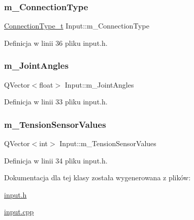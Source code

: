 \subsubsection{\texorpdfstring{m\+\_\+\+Connection\+Type}{m\_ConnectionType}}
{\footnotesize\ttfamily \hyperlink{class_input_a3be20be9b454515798ecd3370f4e36fd}{Connection\+Type\+\_\+t} Input\+::m\+\_\+\+Connection\+Type\hspace{0.3cm}{\ttfamily [private]}}



Definicja w linii 36 pliku input.\+h.

\mbox{\label{class_input_a5d17336e82b13b4a5416ea0bf197c5ba}} 
\subsubsection{\texorpdfstring{m\+\_\+\+Joint\+Angles}{m\_JointAngles}}
{\footnotesize\ttfamily Q\+Vector$<$float$>$ Input\+::m\+\_\+\+Joint\+Angles\hspace{0.3cm}{\ttfamily [private]}}



Definicja w linii 33 pliku input.\+h.

\mbox{\label{class_input_a1ce9ef99c48ee1e7adee67ecadd161c6}} 
\subsubsection{\texorpdfstring{m\+\_\+\+Tension\+Sensor\+Values}{m\_TensionSensorValues}}
{\footnotesize\ttfamily Q\+Vector$<$int$>$ Input\+::m\+\_\+\+Tension\+Sensor\+Values\hspace{0.3cm}{\ttfamily [private]}}



Definicja w linii 34 pliku input.\+h.



Dokumentacja dla tej klasy została wygenerowana z plików\+:\begin{DoxyCompactItemize}
\item 
\hyperlink{input_8h}{input.\+h}\item 
\hyperlink{input_8cpp}{input.\+cpp}\end{DoxyCompactItemize}
